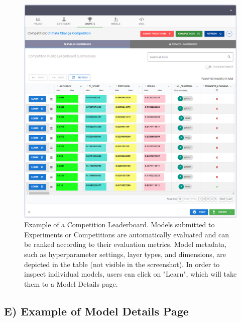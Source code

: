 \begin{figure}[h!]
  \centering
  \includegraphics[width=1\textwidth]{figures/competition.png}
  \caption{Example of a Competition Leaderboard. Models submitted to Experiments or Competitions are automatically evaluated and can be ranked according to their evaluation metrics. Model metadata, such as hyperparameter settings, layer types, and dimensions, are depicted in the table (not visible in the screenshot). In order to inspect individual models, users can click on "Learn", which will take them to a Model Details page.}
\end{figure}


\newpage
\subsection{E) Example of Model Details Page}
\label{app:model}

